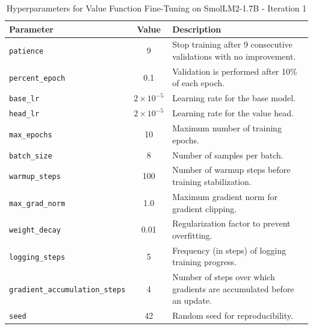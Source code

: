\documentclass{article}
\begin{document}
\begin{table}[ht]
\centering
\begin{tabular}{@{}l c p{8cm}@{}}
\toprule
\textbf{Parameter}               & \textbf{Value}        & \textbf{Description} \\ \midrule
\texttt{patience}                & 9                     & Stop training after 9 consecutive validations with no improvement. \\[0.5em]
\texttt{percent\_epoch}          & 0.1                   & Validation is performed after 10\% of each epoch. \\[0.5em]
\texttt{base\_lr}                & $2\times10^{-5}$      & Learning rate for the base model. \\[0.5em]
\texttt{head\_lr}                & $2\times10^{-5}$      & Learning rate for the value head. \\[0.5em]
\texttt{max\_epochs}             & 10                    & Maximum number of training epochs. \\[0.5em]
\texttt{batch\_size}             & 8                     & Number of samples per batch. \\[0.5em]
\texttt{warmup\_steps}           & 100                   & Number of warmup steps before training stabilization. \\[0.5em]
\texttt{max\_grad\_norm}         & 1.0                   & Maximum gradient norm for gradient clipping. \\[0.5em]
\texttt{weight\_decay}           & 0.01                  & Regularization factor to prevent overfitting. \\[0.5em]
\texttt{logging\_steps}          & 5                     & Frequency (in steps) of logging training progress. \\[0.5em]
\texttt{gradient\_accumulation\_steps} & 4              & Number of steps over which gradients are accumulated before an update. \\[0.5em]
\texttt{seed}                    & 42                    & Random seed for reproducibility. \\ \bottomrule
\end{tabular}
\caption{Hyperparameters for Value Function Fine-Tuning on SmolLM2-1.7B - Iteration 1}
\label{tab:hyperparams360}
\end{table}
\end{document}
